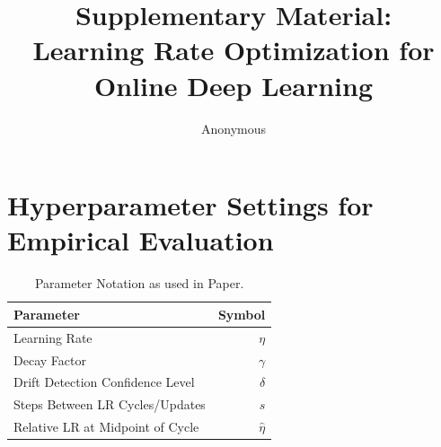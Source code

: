 \documentclass[runningheads]{llncs}
\begin{document}
%
\title{Supplementary Material: \\Learning Rate Optimization for Online Deep Learning}
%
%
\author{Anonymous}
%
%
%

\maketitle

\section*{Hyperparameter Settings for Empirical Evaluation}



\begin{table}[h]
    \centering
    \caption{Parameter Notation as used in Paper.}
    \begin{tabular}{lr}
        \toprule
        Parameter                        & Symbol       \\
        \midrule
        Learning Rate                    & $\eta$       \\
        Decay Factor                     & $\gamma$     \\
        Drift Detection Confidence Level & $\delta$     \\
        Steps Between LR Cycles/Updates  & $s$          \\
        Relative LR at Midpoint of Cycle & $\hat{\eta}$ \\
        \bottomrule
    \end{tabular}
\end{table}
\vspace{-1cm}
\end{document}
